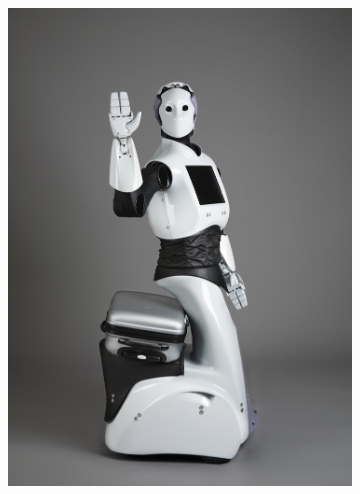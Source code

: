 \begin{figure}
   \centering
   \begin{subfigure}[b]{0.3\textwidth}
       \includegraphics[width=\textwidth]{figures/reemh2}
       \caption{}
       \label{fig:reemh2}
       \end{subfigure}%
       ~ %
       \begin{subfigure}[b]{0.3\textwidth}

\end{subfigure}
\end{figure}
